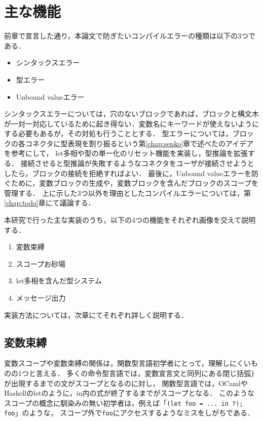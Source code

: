 \chapter{主な機能}\label{chap:features}

前章で宣言した通り，本論文で防ぎたいコンパイルエラーの種類は以下の3つである．
\begin {itemize}
  \item シンタックスエラー
  \item 型エラー
  \item Unbound valueエラー
\end {itemize}

シンタックスエラーについては，穴のないブロックであれば，ブロックと構文木が一対一対応しているために起き得ない．変数名にキーワードが使えないようにする必要もあるが，その対処も行うこととする．
型エラーについては，ブロックの各コネクタに型表現を割り振るという第\ref{chap:senko}章で述べた\cite{Typed-Blockly}のアイデアを参考にして，
let多相や型の単一化のリセット機能を実装し，型推論を拡張する．
接続させると型推論が失敗するようなコネクタをユーザが接続させようとしたら，ブロックの接続を拒絶すればよい．
最後に，Unbound valueエラーを防ぐために，変数ブロックの生成や，変数ブロックを含んだブロックのスコープを管理する．
上に示した3つ以外を理由としたコンパイルエラーについては，第\ref{chap:todo}章にて議論する．

本研究で行った主な実装のうち，以下の4つの機能をそれぞれ画像を交えて説明する．
\begin {enumerate}
  \item 変数束縛
  \item スコープお砂場
  \item let多相を含んだ型システム
  \item メッセージ出力
\end {enumerate}
実装方法については，次章にてそれぞれ詳しく説明する．

\section {変数束縛}

変数スコープや変数束縛の関係は，関数型言語初学者にとって，理解しにくいものの1つと言える．
多くの命令型言語では，変数宣言文と同列にある閉じ括弧{\tt \}}が出現するまでの文がスコープとなるのに対し，
関数型言語では，OCamlやHaskellのletのように，in内の式が終了するまでがスコープとなる．
このようなスコープの概念に馴染みの無い初学者は，例えば「{\tt (let foo = ...\ in ?); foo}」のような，
スコープ外で{\tt foo}にアクセスするようなミスをしがちである．

